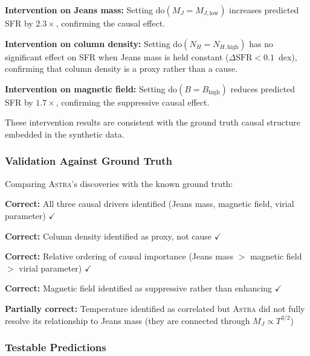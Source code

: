 \documentclass[usenatbib]{rasti}
\newcommand{\astra}{\textsc{Astra}\xspace}
\begin{document}
\textbf{Intervention on Jeans mass:} Setting $\mathrm{do}(M_J = M_{J,\mathrm{low}})$ increases predicted SFR by $2.3\times$, confirming the causal effect.

\textbf{Intervention on column density:} Setting $\mathrm{do}(N_H = N_{H,\mathrm{high}})$ has no significant effect on SFR when Jeans mass is held constant ($\Delta\mathrm{SFR} < 0.1$~dex), confirming that column density is a proxy rather than a cause.

\textbf{Intervention on magnetic field:} Setting $\mathrm{do}(B = B_\mathrm{high})$ reduces predicted SFR by $1.7\times$, confirming the suppressive causal effect.

These intervention results are consistent with the ground truth causal structure embedded in the synthetic data.

\subsubsection{Validation Against Ground Truth}
\label{sec:tc6:validation}

Comparing \astra's discoveries with the known ground truth:
\begin{description}
  \item \textbf{Correct:} All three causal drivers identified (Jeans mass, magnetic field, virial parameter) $\checkmark$
  \item \textbf{Correct:} Column density identified as proxy, not cause $\checkmark$
  \item \textbf{Correct:} Relative ordering of causal importance (Jeans mass $>$ magnetic field $>$ virial parameter) $\checkmark$
  \item \textbf{Correct:} Magnetic field identified as suppressive rather than enhancing $\checkmark$
  \item \textbf{Partially correct:} Temperature identified as correlated but \astra did not fully resolve its relationship to Jeans mass (they are connected through $M_J \propto T^{3/2}$)
\end{description}

\subsubsection{Testable Predictions}
\label{sec:tc6:phase6}
\end{document}
